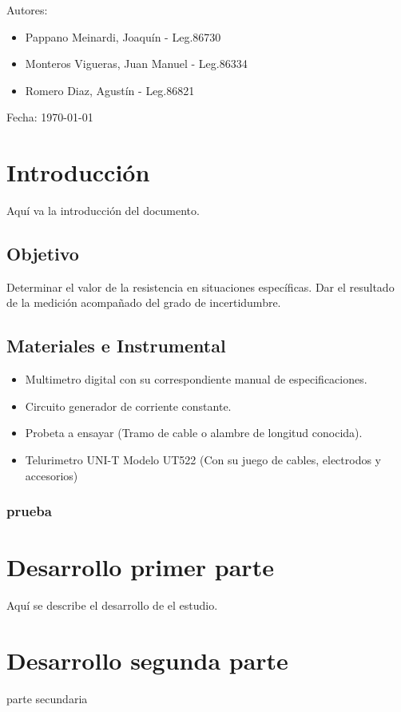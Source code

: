 \documentclass[12pt, letterpaper]{article}
\begin{document}
\begin{titlepage}
        {\Large Autores: \par} %
            \begin{itemize}
                \item{\Large Pappano Meinardi, Joaquín - Leg.86730\par}
                \item{\Large Monteros Vigueras, Juan Manuel - Leg.86334\par}
                \item{\Large Romero Diaz, Agustín - Leg.86821\par}
            \end{itemize}
        \vspace{0.5cm}
        {\Large Fecha: {\today} \par}%
    \end{titlepage}

\newpage
\tableofcontents
\newpage

\section{Introducción}

Aquí va la introducción del documento.

\subsection{Objetivo}
Determinar el valor de la resistencia en situaciones específicas. Dar el resultado de la
medición acompañado del grado de incertidumbre. 

\subsection{Materiales e Instrumental}
\begin{itemize}
    \item Multimetro digital con su correspondiente manual de especificaciones.
    \item Circuito generador de corriente constante.
    \item Probeta a ensayar (Tramo de cable o alambre de longitud conocida).
    \item Telurimetro UNI-T Modelo UT522 (Con su juego de cables, electrodos y accesorios)
\end{itemize}

\subsubsection{prueba}

\section{Desarrollo primer parte}

Aquí se describe el desarrollo de el estudio.

\section{Desarrollo segunda parte}

parte secundaria


\label{LastPage}
\end{document}
